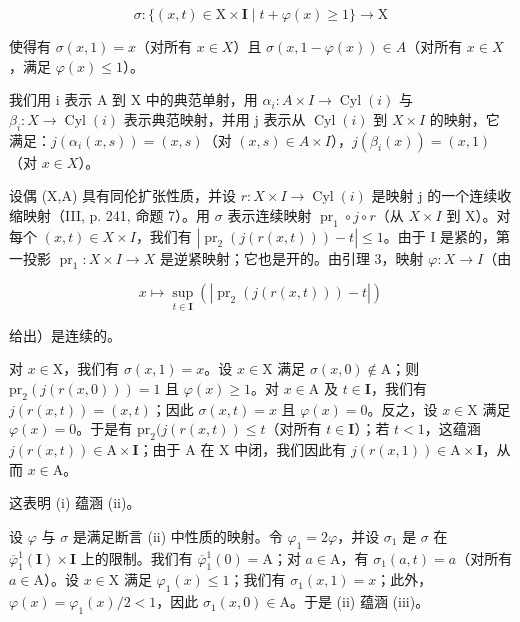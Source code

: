 \[
\sigma \colon \{(x, t) \in \mathrm{X} \times \mathbf {I} \mid t + \varphi (x) \geqslant 1 \} \to \mathrm{X}
\]

使得有 \(\sigma(x,1) = x\)（对所有 \(x \in X\)）且 \(\sigma(x,1 - \varphi(x)) \in A\)（对所有 \(x \in X\)，满足 \(\varphi(x) \leqslant 1\)）。

我们用 i 表示 A 到 X 中的典范单射，用 \(\alpha_{i}\colon A\times I\to\operatorname{Cyl}(i)\) 与 \(\beta_{i}\colon X\to\operatorname{Cyl}(i)\) 表示典范映射，并用 j 表示从 \(\operatorname{Cyl}(i)\) 到 \(X\times I\) 的映射，它满足：\(j(\alpha_{i}(x,s))=(x,s)\)（对 \((x,s)\in A\times I\)），\(j(\beta_{i}(x))=(x,1)\)（对 \(x\in X\)）。

设偶 (X,A) 具有同伦扩张性质，并设 \(r:X\times I\to\operatorname{Cyl}(i)\) 是映射 j 的一个连续收缩映射（III, p. 241, 命题 7）。用 \(\sigma\) 表示连续映射 \(\operatorname{pr}_1\circ j\circ r\)（从 \(X\times I\) 到 X）。对每个 \((x,t)\in X\times I\)，我们有 \(|\operatorname{pr}_2(j(r(x,t)))-t|\leqslant1\)。由于 I 是紧的，第一投影 \(\operatorname{pr}_1:X\times I\to X\) 是逆紧映射；它也是开的。由引理 3，映射 \(\varphi:X\to I\)（由

\[
x \mapsto \sup _ {t \in \mathbf {I}} \left(\left| \operatorname{pr} _ {2} (j (r (x, t))) - t \right|\right)
\]

给出）是连续的。

对 \(x \in \mathrm{X}\)，我们有 \(\sigma(x,1) = x\)。设 \(x \in \mathrm{X}\) 满足 \(\sigma(x,0) \notin \mathrm{A}\)；则 \(\mathrm{pr}_2(j(r(x,0))) = 1\) 且 \(\varphi(x) \geqslant 1\)。对 \(x \in \mathrm{A}\) 及 \(t \in \mathbf{I}\)，我们有 \(j(r(x,t)) = (x,t)\)；因此 \(\sigma(x,t) = x\) 且 \(\varphi(x) = 0\)。反之，设 \(x \in \mathrm{X}\) 满足 \(\varphi(x) = 0\)。于是有 \(\mathrm{pr}_2(j(r(x,t)) \leqslant t\)（对所有 \(t \in \mathbf{I}\)）；若 \(t < 1\)，这蕴涵 \(j(r(x,t)) \in \mathrm{A} \times \mathbf{I}\)；由于 A 在 X 中闭，我们因此有 \(j(r(x,1)) \in \mathrm{A} \times \mathbf{I}\)，从而 \(x \in \mathrm{A}\)。

这表明 (i) 蕴涵 (ii)。

设 \(\varphi\) 与 \(\sigma\) 是满足断言 (ii) 中性质的映射。令 \(\varphi_1 = 2\varphi\)，并设 \(\sigma_1\) 是 \(\sigma\) 在 \(\overline{\varphi}_1^1 (\mathbf{I})\times \mathbf{I}\) 上的限制。我们有 \(\overline{\varphi}_1^1 (0) = \mathrm{A}\)；对 \(a\in \mathrm{A}\)，有 \(\sigma_1(a,t) = a\)（对所有 \(a\in \mathrm{A}\)）。设 \(x\in \mathrm{X}\) 满足 \(\varphi_{1}(x)\leqslant 1\)；我们有 \(\sigma_1(x,1) = x\)；此外，\(\varphi (x) = \varphi_{1}(x) / 2 < 1\)，因此 \(\sigma_{1}(x,0)\in \mathrm{A}\)。于是 (ii) 蕴涵 (iii)。

